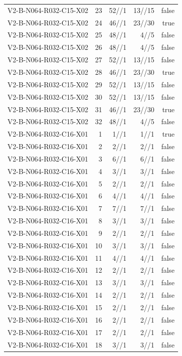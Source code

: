 {\begin{longtable}{lrrrr}
V2-B-N064-R032-C15-X02 & 23 & 52//1 & 13//15 & false \\
V2-B-N064-R032-C15-X02 & 24 & 46//1 & 23//30 & true \\
V2-B-N064-R032-C15-X02 & 25 & 48//1 & 4//5 & false \\
V2-B-N064-R032-C15-X02 & 26 & 48//1 & 4//5 & false \\
V2-B-N064-R032-C15-X02 & 27 & 52//1 & 13//15 & false \\
V2-B-N064-R032-C15-X02 & 28 & 46//1 & 23//30 & true \\
V2-B-N064-R032-C15-X02 & 29 & 52//1 & 13//15 & false \\
V2-B-N064-R032-C15-X02 & 30 & 52//1 & 13//15 & false \\
V2-B-N064-R032-C15-X02 & 31 & 46//1 & 23//30 & true \\
V2-B-N064-R032-C15-X02 & 32 & 48//1 & 4//5 & false \\
V2-B-N064-R032-C16-X01 & 1 & 1//1 & 1//1 & true \\
V2-B-N064-R032-C16-X01 & 2 & 2//1 & 2//1 & false \\
V2-B-N064-R032-C16-X01 & 3 & 6//1 & 6//1 & false \\
V2-B-N064-R032-C16-X01 & 4 & 3//1 & 3//1 & false \\
V2-B-N064-R032-C16-X01 & 5 & 2//1 & 2//1 & false \\
V2-B-N064-R032-C16-X01 & 6 & 4//1 & 4//1 & false \\
V2-B-N064-R032-C16-X01 & 7 & 7//1 & 7//1 & false \\
V2-B-N064-R032-C16-X01 & 8 & 3//1 & 3//1 & false \\
V2-B-N064-R032-C16-X01 & 9 & 2//1 & 2//1 & false \\
V2-B-N064-R032-C16-X01 & 10 & 3//1 & 3//1 & false \\
V2-B-N064-R032-C16-X01 & 11 & 4//1 & 4//1 & false \\
V2-B-N064-R032-C16-X01 & 12 & 2//1 & 2//1 & false \\
V2-B-N064-R032-C16-X01 & 13 & 3//1 & 3//1 & false \\
V2-B-N064-R032-C16-X01 & 14 & 2//1 & 2//1 & false \\
V2-B-N064-R032-C16-X01 & 15 & 2//1 & 2//1 & false \\
V2-B-N064-R032-C16-X01 & 16 & 2//1 & 2//1 & false \\
V2-B-N064-R032-C16-X01 & 17 & 2//1 & 2//1 & false \\
V2-B-N064-R032-C16-X01 & 18 & 3//1 & 3//1 & false \\

\end{longtable}}
